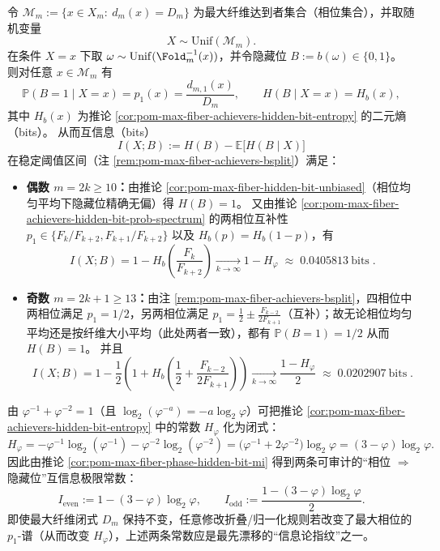 \begin{corollary}\label{cor:pom-max-fiber-phase-hidden-bit-mi}
令 \(\mathcal{M}_m:=\{x\in X_m:\ d_m(x)=D_m\}\) 为最大纤维达到者集合（相位集合），并取随机变量
\[
X\sim\mathrm{Unif}(\mathcal{M}_m).
\]
在条件 \(X=x\) 下取
\(
\omega\sim\mathrm{Unif}(\Fold_m^{-1}(x))
\)，并令隐藏位 \(B:=b(\omega)\in\{0,1\}\)。
则对任意 \(x\in\mathcal{M}_m\) 有
\[
\mathbb{P}(B=1\mid X=x)=p_1(x)=\frac{d_{m,1}(x)}{D_m},
\qquad
H(B\mid X=x)=H_b(x),
\]
其中 \(H_b(x)\) 为推论 \ref{cor:pom-max-fiber-achievers-hidden-bit-entropy} 的二元熵（bits）。
从而互信息（bits）
\[
I(X;B):=H(B)-\mathbb{E}\!\bigl[H(B\mid X)\bigr]
\]
在稳定阈值区间（注 \ref{rem:pom-max-fiber-achievers-bsplit}）满足：
\begin{itemize}
  \item \textbf{偶数 \(m=2k\ge 10\)：}由推论 \ref{cor:pom-max-fiber-hidden-bit-unbiased}（相位均匀平均下隐藏位精确无偏）得 \(H(B)=1\)。
  又由推论 \ref{cor:pom-max-fiber-achievers-hidden-bit-prob-spectrum} 的两相位互补性 \(p_1\in\{F_k/F_{k+2},F_{k+1}/F_{k+2}\}\) 以及 \(H_b(p)=H_b(1-p)\)，有
  \[
  \boxed{\;
  I(X;B)=1-H_b\!\left(\frac{F_k}{F_{k+2}}\right)
  \xrightarrow[k\to\infty]{}
  1-H_\varphi\;\approx\;0.0405813\ \mathrm{bits}\; }.
  \]
  \item \textbf{奇数 \(m=2k+1\ge 13\)：}由注 \ref{rem:pom-max-fiber-achievers-bsplit}，四相位中两相位满足 \(p_1=1/2\)，另两相位满足 \(p_1=\tfrac12\pm \tfrac{F_{k-2}}{2F_{k+1}}\)（互补）；故无论相位均匀平均还是按纤维大小平均（此处两者一致），都有 \(\mathbb{P}(B=1)=1/2\) 从而 \(H(B)=1\)。
  并且
  \[
  \boxed{\;
  I(X;B)=1-\frac{1}{2}\left(1+H_b\!\left(\frac12+\frac{F_{k-2}}{2F_{k+1}}\right)\right)
  \xrightarrow[k\to\infty]{}
  \frac{1-H_\varphi}{2}\;\approx\;0.0202907\ \mathrm{bits}\; }.
  \]
\end{itemize}
\end{corollary}

\begin{remark}\label{rem:pom-max-fiber-hidden-bit-leakage-constants}
由 \(\varphi^{-1}+\varphi^{-2}=1\)（且 \(\log_2(\varphi^{-a})=-a\log_2\varphi\)）可把推论 \ref{cor:pom-max-fiber-achievers-hidden-bit-entropy} 中的常数 \(H_\varphi\) 化为闭式：
\[
H_\varphi
=-\varphi^{-1}\log_2(\varphi^{-1})-\varphi^{-2}\log_2(\varphi^{-2})
=\bigl(\varphi^{-1}+2\varphi^{-2}\bigr)\log_2\varphi
=(3-\varphi)\log_2\varphi.
\]
因此由推论 \ref{cor:pom-max-fiber-phase-hidden-bit-mi} 得到两条可审计的“相位 \(\Rightarrow\) 隐藏位”互信息极限常数：
\[
I_{\mathrm{even}}
:=1-(3-\varphi)\log_2\varphi,
\qquad
I_{\mathrm{odd}}
:=\frac{1-(3-\varphi)\log_2\varphi}{2}.
\]
即使最大纤维闭式 \(D_m\) 保持不变，任意修改折叠/归一化规则若改变了最大相位的 \(p_1\)-谱（从而改变 \(H_\varphi\)），上述两条常数应是最先漂移的“信息论指纹”之一。
\end{remark}

